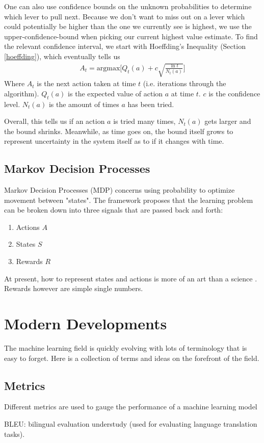 One can also use confidence bounds on the unknown probabilities to determine which lever to pull next. Because we don't want to miss out on a lever which could potentially be higher than the one we currently see is highest, we use the upper-confidence-bound when picking our current highest value estimate. To find the relevant confidence interval, we start with Hoeffding's Inequality (Section \ref{hoeffding}), which eventually tells us
\begin{align}
	A_t = \textrm{argmax}\Big[Q_t(a) + c\sqrt{\frac{\ln t}{N_t(a)}}\Big]
\end{align}
Where $A_t$ is the next action taken at time $t$ (i.e. iterations through the algorithm). $Q_t(a)$ is the expected value of action $a$ at time $t$. $c$ is the confidence level. $N_t(a)$ is the amount of times $a$ has been tried.

Overall, this tells us if an action $a$ is tried many times, $N_t(a)$ gets larger and the bound shrinks. Meanwhile, as time goes on, the bound itself grows to represent uncertainty in the system itself as to if it changes with time.


\subsection{Markov Decision Processes}
Markov Decision Processes (MDP) concerns using probability to optimize movement between "states". The framework proposes that the learning problem can be broken down into three signals that are passed back and forth: 
\begin{enumerate}
	\item Actions $A$
	\item States $S$
	\item Rewards $R$
\end{enumerate}
At present, how to represent states and actions is more of an art than a science \cite{sutton}. Rewards however are simple single numbers.


\section{Modern Developments}
The machine learning field is quickly evolving with lots of terminology that is easy to forget. Here is a collection of terms and ideas on the forefront of the field.


\subsection{Metrics}
Different metrics are used to gauge the performance of a machine learning model

BLEU: bilingual evaluation understudy (used for evaluating language translation tasks).

